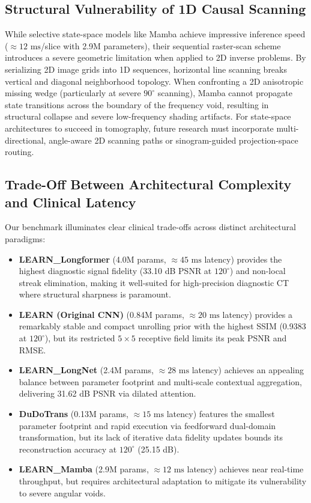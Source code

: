 \documentclass[runningheads]{llncs}
\begin{document}
\subsection{Structural Vulnerability of 1D Causal Scanning}
While selective state-space models like Mamba achieve impressive inference speed ($\approx 12\text{ ms}$/slice with 2.9M parameters), their sequential raster-scan scheme introduces a severe geometric limitation when applied to 2D inverse problems. By serializing 2D image grids into 1D sequences, horizontal line scanning breaks vertical and diagonal neighborhood topology. When confronting a 2D anisotropic missing wedge (particularly at severe $90^\circ$ scanning), Mamba cannot propagate state transitions across the boundary of the frequency void, resulting in structural collapse and severe low-frequency shading artifacts. For state-space architectures to succeed in tomography, future research must incorporate multi-directional, angle-aware 2D scanning paths or sinogram-guided projection-space routing.

\subsection{Trade-Off Between Architectural Complexity and Clinical Latency}
Our benchmark illuminates clear clinical trade-offs across distinct architectural paradigms:
\begin{itemize}
    \item \textbf{LEARN\_Longformer} (4.0M params, $\approx 45\text{ ms}$ latency) provides the highest diagnostic signal fidelity (33.10 dB PSNR at $120^\circ$) and non-local streak elimination, making it well-suited for high-precision diagnostic CT where structural sharpness is paramount.
    \item \textbf{LEARN (Original CNN)} (0.84M params, $\approx 20\text{ ms}$ latency) provides a remarkably stable and compact unrolling prior with the highest SSIM (0.9383 at $120^\circ$), but its restricted $5 \times 5$ receptive field limits its peak PSNR and RMSE.
    \item \textbf{LEARN\_LongNet} (2.4M params, $\approx 28\text{ ms}$ latency) achieves an appealing balance between parameter footprint and multi-scale contextual aggregation, delivering 31.62 dB PSNR via dilated attention.
    \item \textbf{DuDoTrans} (0.13M params, $\approx 15\text{ ms}$ latency) features the smallest parameter footprint and rapid execution via feedforward dual-domain transformation, but its lack of iterative data fidelity updates bounds its reconstruction accuracy at $120^\circ$ (25.15 dB).
    \item \textbf{LEARN\_Mamba} (2.9M params, $\approx 12\text{ ms}$ latency) achieves near real-time throughput, but requires architectural adaptation to mitigate its vulnerability to severe angular voids.
\end{itemize}
\end{document}
